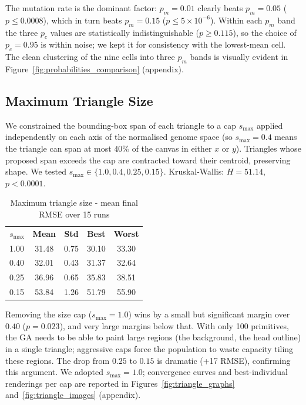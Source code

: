 \documentclass[11pt,a4paper]{article}
\newcommand{\tH}[1]{\textcolor{novagreen}{\textbf{#1}}}
\newcommand{\gmid}{\arrayrulecolor{novagreen}\midrule\arrayrulecolor{black}}
\begin{document}
The mutation rate is the dominant factor: $p_m=0.01$ clearly beats $p_m=0.05$
($p \leq 0.0008$), which in turn beats $p_m=0.15$ ($p \leq 5 \times 10^{-6}$).
Within each $p_m$ band the three $p_c$ values are statistically
indistinguishable ($p \geq 0.115$), so the choice of $p_c=0.95$ is within
noise; we kept it for consistency with the lowest-mean cell. The clean
clustering of the nine cells into three $p_m$ bands is visually evident
in Figure~\ref{fig:probabilities_comparison} (appendix).

\subsection{Maximum Triangle Size}

We constrained the bounding-box span of each triangle to a
cap $s_{\max}$ applied independently on each axis of the normalised genome
space (so $s_{\max}=0.4$ means the triangle can span at most $40\%$ of the
canvas in either $x$ or $y$). Triangles whose proposed span exceeds the cap
are contracted toward their centroid, preserving shape. We tested
$s_{\max} \in \{1.0, 0.4, 0.25, 0.15\}$. Kruskal-Wallis: $H = 51.14$,
$p < 0.0001$.

\begin{table}[h]
\centering
\begin{tabular}{lcccc}
\toprule
\tH{$s_{\max}$} & \tH{Mean} & \tH{Std} & \tH{Best} & \tH{Worst} \\
\gmid
1.00 & 31.48 & 0.75 & 30.10 & 33.30 \\
0.40 & 32.01 & 0.43 & 31.37 & 32.64 \\
0.25 & 36.96 & 0.65 & 35.83 & 38.51 \\
0.15 & 53.84 & 1.26 & 51.79 & 55.90 \\
\bottomrule
\end{tabular}
\caption{Maximum triangle size - mean final RMSE over 15 runs}
\end{table}

Removing the size cap ($s_{\max}=1.0$) wins by a small but significant margin
over $0.40$ ($p = 0.023$), and very large margins below that. With only 100
primitives, the GA needs to be able to paint large regions (the background,
the head outline) in a single triangle; aggressive caps force the population
to waste capacity tiling these regions. The drop from $0.25$ to $0.15$ is
dramatic (+17 RMSE), confirming this argument. We adopted $s_{\max}=1.0$;
convergence curves and best-individual renderings per cap are reported in
Figures~\ref{fig:triangle_graphs} and~\ref{fig:triangle_images} (appendix).
\end{document}
